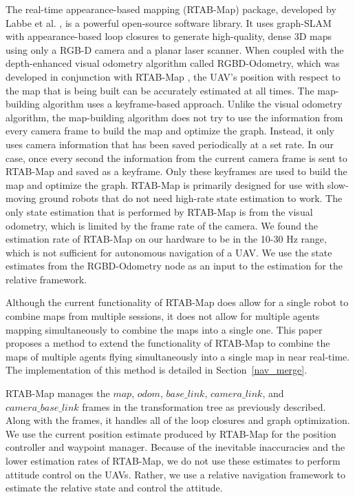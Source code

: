 \documentclass[letterpaper, 10 pt, conference]{ieeeconf}  %
\begin{document}
The real-time appearance-based mapping (RTAB-Map) package, developed by Labbe et al. \cite{Labbe2011a,Labbe2013,Labbe2019}, is a powerful open-source software library. It uses graph-SLAM with appearance-based loop closures to generate high-quality, dense 3D maps using only a RGB-D camera and a planar laser scanner. When coupled with the depth-enhanced visual odometry algorithm called RGBD-Odometry, which was developed in conjunction with RTAB-Map \cite{Labbe2019}, the UAV's position with respect to the map that is being built can be accurately estimated at all times. The map-building algorithm uses a keyframe-based approach. Unlike the visual odometry algorithm, the map-building algorithm does not try to use the information from every camera frame to build the map and optimize the graph. Instead, it only uses camera information that has been saved periodically at a set rate. In our case, once every second the information from the current camera frame is sent to RTAB-Map and saved as a keyframe. Only these keyframes are used to build the map and optimize the graph. RTAB-Map is primarily designed for use with slow-moving ground robots that do not need high-rate state estimation to work. The only state estimation that is performed by RTAB-Map is from the visual odometry, which is limited by the frame rate of the camera. We found the estimation rate of RTAB-Map on our hardware to be in the 10-30 Hz range, which is not sufficient for autonomous navigation of a UAV. We use the state estimates from the RGBD-Odometry node as an input to the estimation for the relative framework.

Although the current functionality of RTAB-Map does allow for a single robot to combine maps from multiple sessions, it does not allow for multiple agents mapping simultaneously to combine the maps into a single one. This paper proposes a method to extend the functionality of RTAB-Map to combine the maps of multiple agents flying simultaneously into a single map in near real-time. The implementation of this method is detailed in Section~\ref{nav_merge}.

RTAB-Map manages the $\mathit{map}$, $\mathit{odom}$, $\mathit{base\_link}$, $\mathit{camera\_link}$, and $\mathit{camera\_base\_link}$ frames in the transformation tree as previously described. Along with the frames, it handles all of the loop closures and graph optimization. We use the current position estimate produced by RTAB-Map for the position controller and waypoint manager. Because of the inevitable inaccuracies and the lower estimation rates of RTAB-Map, we do not use these estimates to perform attitude control on the UAVs. Rather, we use a relative navigation framework to estimate the relative state and control the attitude.
\end{document}
